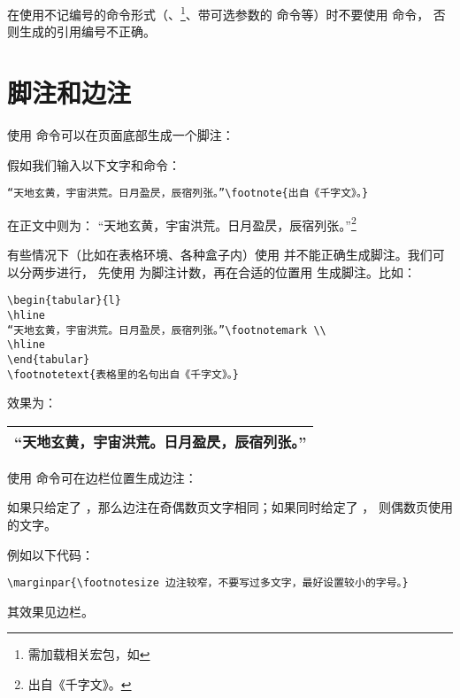 在使用不记编号的命令形式（、\footnote{需加载相关宏包，如 }、带可选参数的  命令等）时不要使用  命令，
否则生成的引用编号不正确。

\section{脚注和边注}\label{sec:footnote-marginpar}

使用  命令可以在页面底部生成一个脚注：
\begin{command}
\end{command}

假如我们输入以下文字和命令：
\begin{verbatim}
“天地玄黄，宇宙洪荒。日月盈昃，辰宿列张。”\footnote{出自《千字文》。}
\end{verbatim}

在正文中则为：%
“天地玄黄，宇宙洪荒。日月盈昃，辰宿列张。”\footnote{出自《千字文》。}

有些情况下（比如在表格环境、各种盒子内）使用  并不能正确生成脚注。我们可以分两步进行，
先使用  为脚注计数，再在合适的位置用  生成脚注。比如：

\begin{verbatim}
\begin{tabular}{l}
\hline
“天地玄黄，宇宙洪荒。日月盈昃，辰宿列张。”\footnotemark \\
\hline
\end{tabular}
\footnotetext{表格里的名句出自《千字文》。}
\end{verbatim}

效果为：

\leavevmode\begin{tabular}{l}
\hline
“天地玄黄，宇宙洪荒。日月盈昃，辰宿列张。”\footnotemark \\
\hline
\end{tabular}

使用  命令可在边栏位置生成边注：
\begin{command}
\end{command}
如果只给定了 ，那么边注在奇偶数页文字相同；如果同时给定了 ，
则偶数页使用  的文字。

例如以下代码：
\begin{verbatim}
\marginpar{\footnotesize 边注较窄，不要写过多文字，最好设置较小的字号。}
\end{verbatim}
其效果见边栏。

